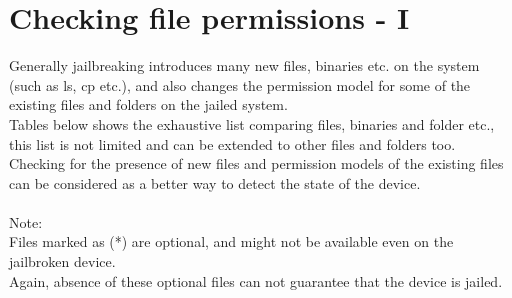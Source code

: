 \section{Checking file permissions - I}
\vspace{20px}
Generally jailbreaking introduces many new files, binaries etc. on the system (such as ls, cp etc.), and also changes the permission model for some of the existing files and folders on the jailed system.\\
Tables below shows the exhaustive list comparing files, binaries and folder etc., this list is not limited and can be extended to other files and folders too.\\
Checking for the presence of new files and permission models of the existing files can be considered as a better way to detect the state of the device.\\\\
Note:\\
Files marked as (*) are optional, and might not be available even on the jailbroken device.\\
Again, absence of these optional files can not guarantee that the device is jailed.
